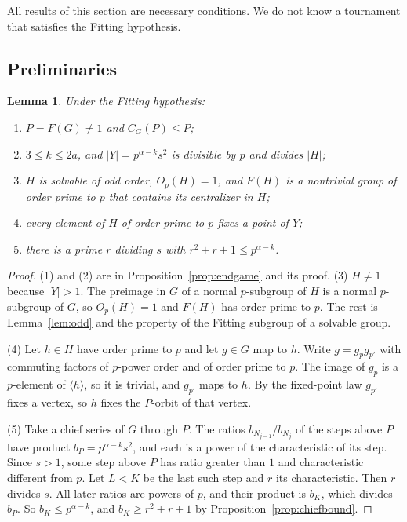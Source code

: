 \documentclass[11pt]{amsart}
\newtheorem{lemma}[theorem]{Lemma}
\theoremstyle{definition}
\theoremstyle{remark}
\begin{document}
All results of this section are necessary conditions. We do not know a tournament that satisfies the Fitting hypothesis.

\subsection{Preliminaries}

\begin{lemma}\label{lem:basic}
Under the Fitting hypothesis:
\begin{enumerate}
\item $P=F(G)\ne1$ and $C_G(P)\le P$;
\item $3\le k\le2a$, and $|Y|=p^{\alpha-k}s^2$ is divisible by $p$ and divides $|H|$;
\item $H$ is solvable of odd order, $O_p(H)=1$, and $F(H)$ is a nontrivial group of order prime to $p$ that contains its centralizer in $H$;
\item every element of $H$ of order prime to $p$ fixes a point of $Y$;
\item there is a prime $r$ dividing $s$ with $r^2+r+1\le p^{\alpha-k}$.
\end{enumerate}
\end{lemma}
\begin{proof}
(1) and (2) are in Proposition~\ref{prop:endgame} and its proof. (3) $H\ne1$ because $|Y|>1$. The preimage in $G$ of a normal $p$-subgroup of $H$ is a normal $p$-subgroup of $G$, so $O_p(H)=1$ and $F(H)$ has order prime to $p$. The rest is Lemma~\ref{lem:odd} and the property of the Fitting subgroup of a solvable group.

(4) Let $h\in H$ have order prime to $p$ and let $g\in G$ map to $h$. Write $g=g_pg_{p'}$ with commuting factors of $p$-power order and of order prime to $p$. The image of $g_p$ is a $p$-element of $\langle h\rangle$, so it is trivial, and $g_{p'}$ maps to $h$. By the fixed-point law $g_{p'}$ fixes a vertex, so $h$ fixes the $P$-orbit of that vertex.

(5) Take a chief series of $G$ through $P$. The ratios $b_{N_{j-1}}/b_{N_j}$ of the steps above $P$ have product $b_P=p^{\alpha-k}s^2$, and each is a power of the characteristic of its step. Since $s>1$, some step above $P$ has ratio greater than $1$ and characteristic different from $p$. Let $L<K$ be the last such step and $r$ its characteristic. Then $r$ divides $s$. All later ratios are powers of $p$, and their product is $b_K$, which divides $b_P$. So $b_K\le p^{\alpha-k}$, and $b_K\ge r^2+r+1$ by Proposition~\ref{prop:chiefbound}.
\end{proof}
\end{document}
